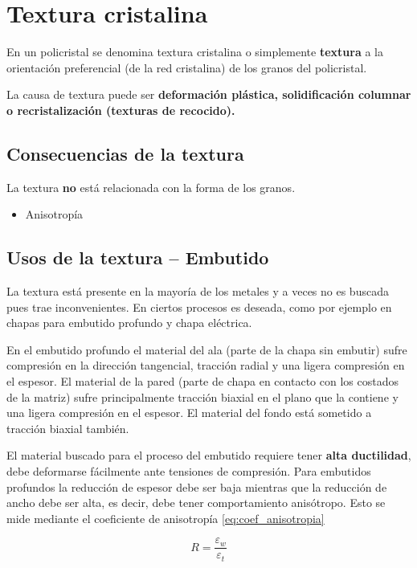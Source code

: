 \section{Textura cristalina}

En un policristal se denomina textura cristalina o simplemente \textbf{textura} a la orientación preferencial (de la red cristalina) de los granos del policristal.

La causa de textura puede ser {\bf deformación plástica, solidificación columnar o recristalización (texturas de recocido).} 

\subsection{Consecuencias de la textura}
La textura \textbf{no} está relacionada con la forma de los granos.

\begin{itemize}
	\item Anisotropía
\end{itemize}

\subsection[Usos de la textura]{Usos de la textura -- Embutido}
La textura está presente en la mayoría de los metales y a veces no es buscada pues trae inconvenientes. En ciertos procesos es deseada, como por ejemplo en chapas para embutido profundo y chapa eléctrica.

En el embutido profundo el material del ala (parte de la chapa sin embutir) sufre compresión en la dirección tangencial, tracción radial y una ligera compresión en el espesor. El material de la pared (parte de chapa en contacto con los costados de la matriz) sufre principalmente tracción biaxial en el plano que la contiene y una ligera compresión en el espesor. El material del fondo está sometido a tracción biaxial también.

El material buscado para el proceso del embutido requiere tener \textbf{alta ductilidad}, debe deformarse fácilmente ante tensiones de compresión. Para embutidos profundos la reducción de espesor debe ser baja mientras que la reducción de ancho debe ser alta, es decir, debe tener comportamiento anisótropo. Esto se mide mediante el coeficiente de anisotropía \eqref{eq:coef_anisotropia}

\begin{equation} \label{eq:coef_anisotropia}
	R = \frac{\varepsilon_w}{\varepsilon_t}
\end{equation}

